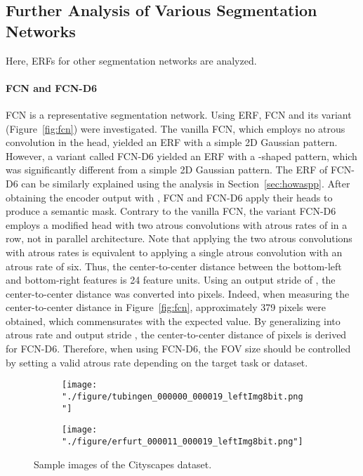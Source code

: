 \documentclass{article}
\def\secref#1{Section~\ref{#1}}
\def\figref#1{Figure~\ref{#1}}
\begin{document}
\subsection{Further Analysis of Various Segmentation Networks}
Here, ERFs for other segmentation networks are analyzed.

\paragraph{FCN and FCN-D6} FCN \citep{DBLP:journals/pami/ShelhamerLD17} is a representative segmentation network. Using ERF, FCN and its variant (\figref{fig:fcn}) were investigated. The vanilla FCN, which employs no atrous convolution in the head, yielded an ERF with a simple 2D Gaussian pattern. However, a variant called FCN-D6 yielded an ERF with a -shaped pattern, which was significantly different from a simple 2D Gaussian pattern. The ERF of FCN-D6 can be similarly explained using the analysis in \secref{sec:howaspp}. After obtaining the encoder output  with , FCN and FCN-D6 apply their heads to produce a semantic mask. Contrary to the vanilla FCN, the variant FCN-D6 employs a modified head with two  atrous convolutions with atrous rates of  in a row, not in parallel architecture. Note that applying the two  atrous convolutions with atrous rates  is equivalent to applying a single  atrous convolution with an atrous rate of six. Thus, the center-to-center distance between the bottom-left and bottom-right features is 24 feature units. Using an output stride of , the center-to-center distance was converted into  pixels. Indeed, when measuring the center-to-center distance in \figref{fig:fcn}, approximately 379 pixels were obtained, which commensurates with the expected value. By generalizing into atrous rate  and output stride , the center-to-center distance of  pixels is derived for FCN-D6. Therefore, when using FCN-D6, the FOV size should be controlled by setting a valid atrous rate  depending on the target task or dataset.

\begin{figure}[t!]
	\centering
	\begin{subfigure}[b]{0.69\linewidth}
		\centering
		\texttt{[image: "./figure/tubingen\_000000\_000019\_leftImg8bit.png"]}
	\end{subfigure}
	\hfill
	\begin{subfigure}[b]{0.69\linewidth}
		\centering
		\texttt{[image: "./figure/erfurt\_000011\_000019\_leftImg8bit.png"]}
	\end{subfigure}
	\caption{Sample images of the Cityscapes dataset.}
	\label{fig:citysample}
\end{figure}
\end{document}
